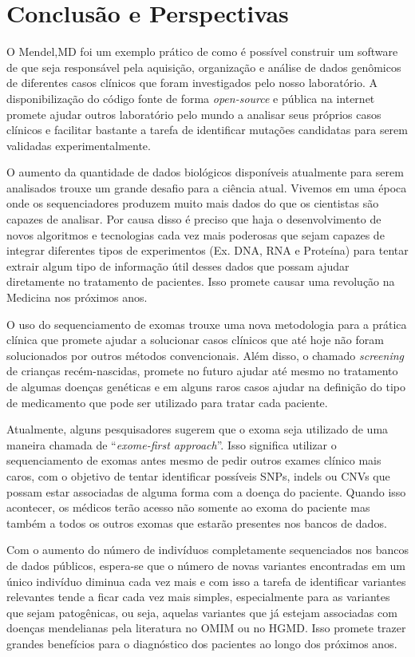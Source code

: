 \chapter{Conclusão e Perspectivas}

O Mendel,MD foi um exemplo prático de como é possível construir um software de que seja responsável pela aquisição, organização e análise de dados genômicos de diferentes casos clínicos que foram investigados pelo nosso laboratório. A disponibilização do código fonte de forma \textit{open-source} e pública na internet promete ajudar outros laboratório pelo mundo a analisar seus próprios casos clínicos e facilitar bastante a tarefa de identificar mutações candidatas para serem validadas experimentalmente.

O aumento da quantidade de dados biológicos disponíveis atualmente para serem analisados trouxe um grande desafio para a ciência atual. Vivemos em uma época onde os sequenciadores produzem muito mais dados do que os cientistas são capazes de analisar. Por causa disso é preciso que haja o desenvolvimento de novos algoritmos e tecnologias cada vez mais poderosas que sejam capazes de integrar diferentes tipos de experimentos (Ex. DNA, RNA e Proteína) para tentar extrair algum tipo de informação útil desses dados que possam ajudar diretamente no tratamento de pacientes. Isso promete causar uma revolução na Medicina nos próximos anos.

O uso do sequenciamento de exomas trouxe uma nova metodologia para a prática clínica que promete ajudar a solucionar casos clínicos que até hoje não foram solucionados por outros métodos convencionais. Além disso, o chamado \textit{screening} de crianças recém-nascidas, promete no futuro ajudar até mesmo no tratamento de algumas doenças genéticas e em alguns raros casos ajudar na definição do tipo de medicamento que pode ser utilizado para tratar cada paciente.

Atualmente, alguns pesquisadores sugerem que o exoma seja utilizado de uma maneira chamada de ``\textit{exome-first approach}''. Isso significa utilizar o sequenciamento de exomas antes mesmo de pedir outros exames clínico mais caros, com o objetivo de tentar identificar possíveis SNPs, indels ou CNVs que possam estar associadas de alguma forma com a doença do paciente. Quando isso acontecer, os médicos terão acesso não somente ao exoma do paciente mas também a todos os outros exomas que estarão presentes nos bancos de dados.

Com o aumento do número de indivíduos completamente sequenciados nos bancos de dados públicos, espera-se que o número de novas variantes encontradas em um único indivíduo diminua cada vez mais e com isso a tarefa de identificar variantes relevantes tende a ficar cada vez mais simples, especialmente para as variantes que sejam patogênicas, ou seja, aquelas variantes que já estejam associadas com doenças mendelianas pela literatura no OMIM ou no HGMD. Isso promete trazer grandes benefícios para o diagnóstico dos pacientes ao longo dos próximos anos.

